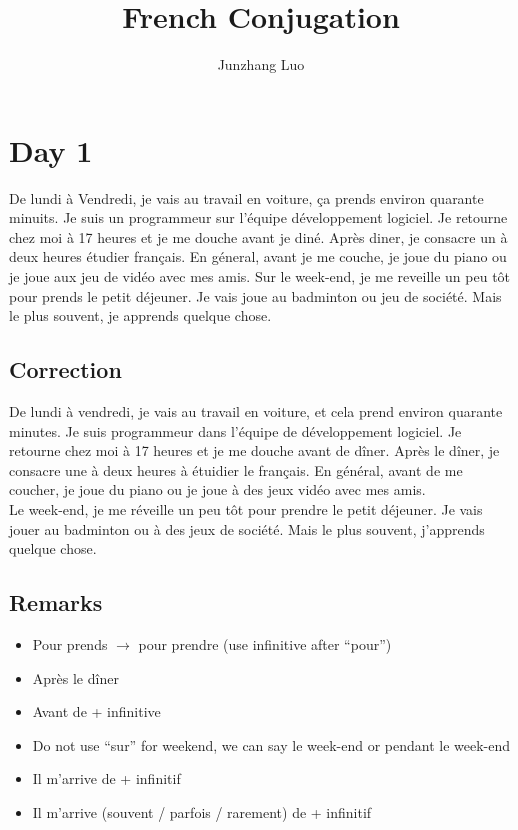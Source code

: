 \documentclass{book}
\title{French Conjugation}
\author{Junzhang Luo}
\begin{document}
\tableofcontents

\section{Day 1}
    De lundi à Vendredi, je vais au travail en voiture, ça prends environ quarante minuits.
    Je suis un programmeur sur l'équipe développement logiciel. 
    Je retourne chez moi à 17 heures et je me douche avant je diné. 
    Après diner, je consacre un à deux heures étudier français.
    En géneral, avant je me couche, je joue du piano ou je joue aux jeu de vidéo avec mes amis.
    Sur le week-end, je me reveille un peu tôt pour prends le petit déjeuner.
    Je vais joue au badminton ou jeu de société. Mais le plus souvent, je apprends quelque chose.

    \subsection{Correction}
        De lundi à vendredi, je vais au travail en voiture, et cela prend environ quarante minutes.
        Je suis programmeur dans l'équipe de développement logiciel.
        Je retourne chez moi à 17 heures et je me douche avant de dîner.
        Après le dîner, je consacre une à deux heures à étuidier le français.
        En général, avant de me coucher, je joue du piano ou je joue à des jeux vidéo avec mes amis.
        \\
        Le week-end, je me réveille un peu tôt pour prendre le petit déjeuner.
        Je vais jouer au badminton ou à des jeux de société. Mais le plus souvent, j'apprends quelque chose.

    \subsection{Remarks}
        \begin{itemize}
            \item Pour prends $\to$ pour prendre (use infinitive after ``pour'')
            \item Après le dîner
            \item Avant de + infinitive
            \item Do not use ``sur'' for weekend, we can say le week-end or pendant le week-end
            \item Il m'arrive de + infinitif
            \item Il m'arrive (souvent / parfois / rarement) de + infinitif
        \end{itemize}
\end{document}

